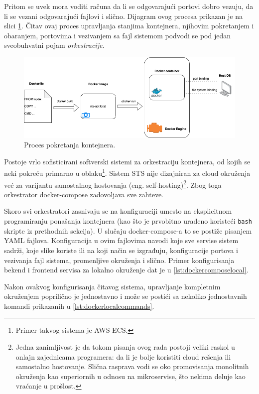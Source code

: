 \documentclass[12pt,oneside]{memoir}
\begin{document}
Pritom se uvek mora voditi računa da li se odgovarajući portovi dobro vezuju, da li se vezani odgovarajući fajlovi i slično. Dijagram ovog procesa prikazan je na slici \ref{fig:dockermanual}. Čitav ovaj proces upravljanja stanjima kontejnera, njihovim pokretanjem i obaranjem, portovima i vezivanjem sa fajl sistemom podvodi se pod jedan sveobuhvatni pojam \textit{orkestracije}.

\begin{figure}[h]
  \centering
  \includegraphics[width=1\textwidth]{docs/images/ch_6/dockermanual.png} 
  \caption{Proces pokretanja kontejnera.}
  \label{fig:dockermanual}
\end{figure}

Postoje vrlo sofisticirani softverski sistemi za orkestraciju kontejnera, od kojih se neki pokreću primarno u oblaku\footnote{Primer takvog sistema je AWS ECS.}. Sistem STS nije dizajniran za cloud okruženja već za varijantu samostalnog hostovanja (eng. self-hosting)\footnote{Jedna zanimljivost je da tokom pisanja ovog rada postoji veliki raskol u onlajn zajednicama programera: da li je bolje koristiti cloud rešenja ili samostalno hostovanje. Slična rasprava vodi se oko promovisanja monolitnih okruženja kao superiornih u odnosu na mikroservise, što nekima deluje kao vraćanje u prošlost.}. Zbog toga orkestrator docker-compose zadovoljava sve zahteve.

Skoro svi orkestratori zasnivaju se na konfiguraciji umesto na eksplicitnom programiranju ponašanja kontejnera (kao što je prvobitno urađeno koristeći \verb|bash| skripte iz prethodnih sekcija). U slučaju docker-compose-a to se postiže pisanjem YAML fajlova. Konfiguracija u ovim fajlovima navodi koje sve servise sistem sadrži, koje slike koriste ili na koji način se izgrađuju, konfiguracije portova i vezivanja fajl sistema, promenljive okruženja i slično. Primer konfigurisanja bekend i frontend servisa za lokalno okruženje dat je u \ref{lst:dockercomposelocal}.

Nakon ovakvog konfigurisanja čitavog sistema, upravljanje kompletnim okruženjem poprilično je jednostavno i može se postići sa nekoliko jednostavnih komandi prikazanih u \ref{lst:dockerlocalcommands}.
\end{document}
